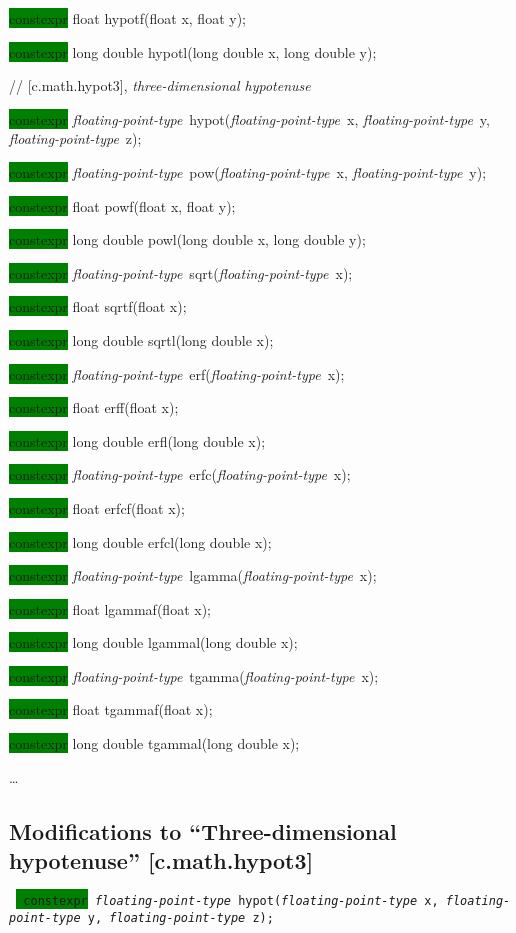 \documentclass[prd,twocolumn,amsmath,amssymb,nofootinbib,eqsecnum]{revtex4-1}
\newcommand{\code}[1]{{\tt #1}}
\newcommand{\highlight}[1]{\colorbox{green}{\!\!\!\! #1}}
\newcommand{\fptype}{{\it floating-point-type}}
\begin{document}
{\highlight{constexpr} float hypotf(float x, float y);

\highlight{constexpr} long double hypotl(long double x, long double y);

\vspace{2ex}

// [c.math.hypot3], {\it three-dimensional hypotenuse}


\highlight{constexpr} \fptype\ hypot(\fptype\ x, \fptype\ y, \fptype\ z);

\vspace{2ex}

\highlight{constexpr} \fptype\ pow(\fptype\ x, \fptype\ y); 

\highlight{constexpr} float powf(float x, float y);

\highlight{constexpr} long double powl(long double x, long double y);

\vspace{2ex}


\highlight{constexpr} \fptype\ sqrt(\fptype\ x);

\highlight{constexpr} float sqrtf(float x);

\highlight{constexpr} long double sqrtl(long double x);

\vspace{2ex}


\highlight{constexpr} \fptype\ erf(\fptype\ x);

\highlight{constexpr} float erff(float x);

\highlight{constexpr} long double erfl(long double x);

\vspace{2ex}

\highlight{constexpr} \fptype\ erfc(\fptype\ x);

\highlight{constexpr} float erfcf(float x);

\highlight{constexpr} long double erfcl(long double x);

\vspace{2ex}


\highlight{constexpr} \fptype\ lgamma(\fptype\ x);

\highlight{constexpr} float lgammaf(float x);

\highlight{constexpr} long double lgammal(long double x);

\vspace{2ex}

\highlight{constexpr} \fptype\ tgamma(\fptype\ x);

\highlight{constexpr} float tgammaf(float x);

\highlight{constexpr} long double tgammal(long double x);

\ldots

}


\subsection{Modifications to ``Three-dimensional hypotenuse''  [c.math.hypot3]}

\code{
	\highlight{constexpr} \fptype\ hypot(\fptype\ x, \fptype\ y, \fptype\ z);
}
\end{document}
